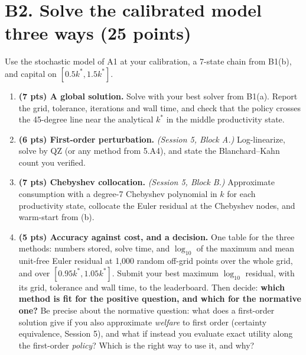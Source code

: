 \documentclass[11pt]{article}
\newif\ifsolutions \solutionsfalse
\newcommand{\solution}[1]{\ifsolutions\medskip
  {\color{blue!45!black}\textbf{Solution.} #1}\medskip\fi}
\begin{document}
\section*{B2. Solve the calibrated model three ways (25 points)}

Use the stochastic model of A1 at your calibration, a 7-state chain from B1(b), and capital on
$[0.5k^*,1.5k^*]$.

\begin{enumerate}[label=(\alph*), leftmargin=*]

\item \textbf{(7 pts) A global solution.} Solve with your best solver from B1(a). Report the grid,
tolerance, iterations and wall time, and check that the policy crosses the 45-degree line near the
analytical $k^*$ in the middle productivity state.

\solution{\keyBthree}

\item \textbf{(6 pts) First-order perturbation.} \emph{(Session 5, Block A.)} Log-linearize, solve by
QZ (or any method from 5.A4), and state the Blanchard--Kahn count you verified.

\solution{\keyBfour}

\item \textbf{(7 pts) Chebyshev collocation.} \emph{(Session 5, Block B.)} Approximate consumption with
a degree-7 Chebyshev polynomial in $k$ for each productivity state, collocate the Euler residual at
the Chebyshev nodes, and warm-start from (b).

\solution{\keyBfive}

\item \textbf{(5 pts) Accuracy against cost, and a decision.} One table for the three methods: numbers
stored, solve time, and $\log_{10}$ of the maximum and mean unit-free Euler residual at 1,000 random
off-grid points over the whole grid, and over $[0.95k^*,1.05k^*]$. Submit your best maximum
$\log_{10}$ residual, with its grid, tolerance and wall time, to the leaderboard. Then decide:
\textbf{which method is fit for the positive question, and which for the normative one?} Be precise
about the normative question: what does a first-order solution give if you also approximate
\emph{welfare} to first order (certainty equivalence, Session 5), and what if instead you evaluate
exact utility along the first-order \emph{policy}? Which is the right way to use it, and why?

\solution{\keyBsix}

\end{enumerate}
\end{document}
